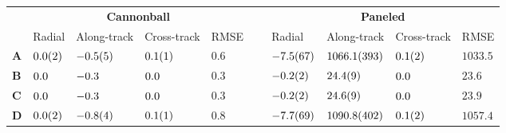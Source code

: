 \begin{tabular}{llllllllll}
\toprule
 & \multicolumn{4}{c}{\bfseries Cannonball} & \bfseries  & \multicolumn{4}{c}{\bfseries Paneled} \\
 & Radial & Along-track & Cross-track & RMSE &  & Radial & Along-track & Cross-track & RMSE \\
\cmidrule{2-5}\cmidrule{7-10}
\bfseries A & $\num{+0.0 \pm 0.2}$ & $\num{-0.5 \pm 0.5}$ & $\num{+0.1 \pm 0.1}$ & $\num{0.6}$ & ~ & $\num{-7.5 \pm 6.7}$ & $\num{+1066.1 \pm 39.3}$ & $\num{+0.1 \pm 0.2}$ & $\num{1033.5}$ \\
\bfseries B & $\num{+0.0 \pm 0.0}$ & $\num{-0.3 \pm 0.0}$ & $\num{+0.0 \pm 0.0}$ & $\num{0.3}$ & ~ & $\num{-0.2 \pm 0.2}$ & $\num{+24.4 \pm 0.9}$ & $\num{+0.0 \pm 0.0}$ & $\num{23.6}$ \\
\bfseries C & $\num{+0.0 \pm 0.0}$ & $\num{-0.3 \pm 0.0}$ & $\num{+0.0 \pm 0.0}$ & $\num{0.3}$ & ~ & $\num{-0.2 \pm 0.2}$ & $\num{+24.6 \pm 0.9}$ & $\num{+0.0 \pm 0.0}$ & $\num{23.9}$ \\
\bfseries D & $\num{+0.0 \pm 0.2}$ & $\num{-0.8 \pm 0.4}$ & $\num{+0.1 \pm 0.1}$ & $\num{0.8}$ & ~ & $\num{-7.7 \pm 6.9}$ & $\num{+1090.8 \pm 40.2}$ & $\num{+0.1 \pm 0.2}$ & $\num{1057.4}$ \\
\bottomrule
\end{tabular}
